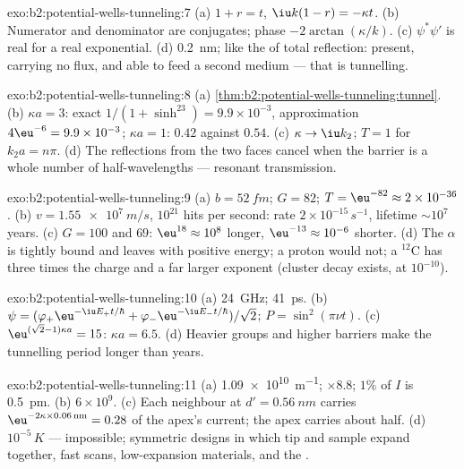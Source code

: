 \begin{solution}{exo:b2:potential-wells-tunneling:7}
(a) $1 + r = t$, $\iu k(1 - r) = -\kappa t$. (b) Numerator and denominator
are conjugates; phase $-2\arctan(\kappa/k)$. (c) $\psi^*\psi'$ is real for a
real exponential. (d) \qty{0.2}{nm}; like the  of total
reflection: present, carrying no flux, and able to feed a second medium
--- that is tunnelling.
\end{solution}

\begin{solution}{exo:b2:potential-wells-tunneling:8}
(a) \cref{thm:b2:potential-wells-tunneling:tunnel}. (b) $\kappa a = 3$:
exact $1/(1 + \sinh^23) = 9.9 \times 10^{-3}$, approximation $4\eu^{-6} = 9.9 \times
10^{-3}$; $\kappa a = 1$: $0.42$ against $0.54$. (c) $\kappa \to \iu k_2$; $T = 1$
for $k_2a = n\pi$. (d) The reflections from the two faces cancel when the
barrier is a whole number of half-wavelengths --- resonant
transmission.
\end{solution}

\begin{solution}{exo:b2:potential-wells-tunneling:9}
(a) $b = \qty{52}{fm}$; $G = 82$; $T = \eu^{-82} \approx 2 \times 10^{-36}$. (b) $v =
\qty{1.55e7}{m/s}$, $10^{21}$ hits per second: rate $2 \times 10^{-15}\,\unit{s^{-1}}$,
lifetime $\sim 10^7$ years. (c) $G = 100$ and $69$: $\eu^{18} \approx 10^8$ longer,
$\eu^{-13} \approx 10^{-6}$ shorter. (d) The $\alpha$ is tightly bound and leaves
with positive energy; a proton would not; a $^{12}$C has three times the
charge and a far larger exponent (cluster decay exists, at $10^{-10}$).
\end{solution}

\begin{solution}{exo:b2:potential-wells-tunneling:10}
(a) \qty{24}{GHz}; \qty{41}{ps}. (b) $\psi = (\varphi_+\eu^{-\iu E_+t/\hbar} +
\varphi_-\eu^{-\iu E_-t/\hbar})/\sqrt2$; $P = \sin^2(\pi\nu t)$. (c) $\eu^{(\sqrt2 - 1)
\kappa a} = 15$: $\kappa a = 6.5$. (d) Heavier groups and higher barriers make
the tunnelling period longer than years.
\end{solution}

\begin{solution}{exo:b2:potential-wells-tunneling:11}
(a) \qty{1.09e10}{m^{-1}}; $\times 8.8$; $1\%$ of $I$ is \qty{0.5}{pm}. (b) $6 \times 10^9$.
(c) Each neighbour at $d' = \qty{0.56}{nm}$ carries $\eu^{-2\kappa \times 0.06\,\text{nm}}
= 0.28$ of the apex's current; the apex carries about half. (d)
$10^{-5}\,\unit{K}$ --- impossible; symmetric designs in which tip and sample
expand together, fast scans, low-expansion materials, and the .
\end{solution}


